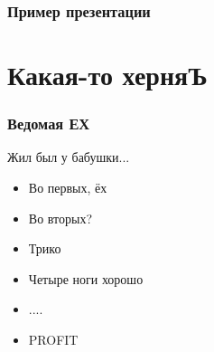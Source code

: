 \documentclass[ignorenonframetext, professionalfonts, hyperref={pdftex, unicode}]{beamer}
\begin{document}
\begin{frame}
   \frametitle{Пример презентации}
   \titlepage
\end{frame}

\section{Какая-то херняЪ}
\begin{frame}
  \frametitle{Ведомая ЕХ}
Жил был у бабушки...
\begin{itemize}
 \item Во первых, ёх
 \item Во вторых?
 \item Трико
 \item Четыре ноги хорошо
 \item ....
 \item PROFIT
\end{itemize}
\end{frame}
\end{document}
